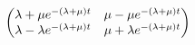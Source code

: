 \documentclass[12pt]{article}
\theoremstyle{plain}
\theoremstyle{definition}
\theoremstyle{remark}
\begin{document}
\begin{enumerate}
\begin{enumerate}
\begin{align}
\begin{pmatrix}
            \lambda + \mu e^{-(\lambda+\mu)t}
              & \mu-\mu e^{-(\lambda+\mu)t} \\
            \lambda -\lambda e^{-(\lambda+\mu)t}
              & \mu + \lambda e^{-(\lambda+\mu)t} \\
          \end{pmatrix} \notag
      \end{align}

\end{enumerate}
\end{enumerate}
\end{document}
